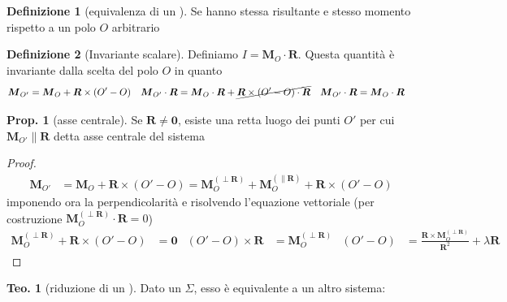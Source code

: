 \documentclass[a4paper,10pt]{article}
\theoremstyle{definition}
\theoremstyle{indentdefinition}
\newtheorem{defn}{Definizione}[section]
\theoremstyle{indenttheorem}
\newtheorem{thm}{Teo.}
\newtheorem{prop}{Prop.}
\theoremstyle{myremark}
\theoremstyle{indentgeneral}
\begin{document}
\begin{defn}[equivalenza di un ]
\label{def:equivalenza-sistema-vettori-applicati}Se hanno stessa
risultante e stesso momento rispetto a un polo $O$ arbitrario
\end{defn}

\begin{defn}[Invariante scalare]
\label{def:invariante-momento}Definiamo $I=\boldsymbol{M}_{O}\cdot\boldsymbol{R}$.
Questa quantità è invariante dalla scelta del polo $O$ in quanto
\begin{align*}
\boldsymbol{M}_{O'} & =\boldsymbol{M}_{O}+\boldsymbol{R}\times\left(O'-O\right) & \boldsymbol{M}_{O'}\cdot\boldsymbol{R} & =\boldsymbol{M}_{O}\cdot\boldsymbol{R}+\cancel{\boldsymbol{R}\times\left(O'-O\right)\cdot\boldsymbol{R}} & \boldsymbol{M}_{O'}\cdot\boldsymbol{R} & =\boldsymbol{M}_{O}\cdot\boldsymbol{R}
\end{align*}
\end{defn}

\begin{prop}[asse centrale]
\label{prop:asse-centrale}Se $\boldsymbol{R}\neq\boldsymbol{0}$,
esiste una retta luogo dei punti $O'$ per cui $\boldsymbol{M}_{O'}\parallel\boldsymbol{R}$
detta asse centrale del sistema
\end{prop}

\begin{proof}
\begin{align*}
\boldsymbol{M}_{O'} & =\boldsymbol{M}_{O}+\boldsymbol{R}\times\left(O'-O\right)=\boldsymbol{M}_{O}^{\left(\perp\boldsymbol{R}\right)}+\boldsymbol{M}_{O}^{\left(\parallel\boldsymbol{R}\right)}+\boldsymbol{R}\times\left(O'-O\right)
\end{align*}
imponendo ora la perpendicolarità e risolvendo l'equazione vettoriale
(per costruzione $\boldsymbol{M}_{O}^{\left(\perp\boldsymbol{R}\right)}\cdot\boldsymbol{R}=0$)
\begin{align*}
\boldsymbol{M}_{O}^{\left(\perp\boldsymbol{R}\right)}+\boldsymbol{R}\times\left(O'-O\right) & =\boldsymbol{0} & \left(O'-O\right)\times\boldsymbol{R} & =\boldsymbol{M}_{O}^{\left(\perp\boldsymbol{R}\right)} & \left(O'-O\right) & =\frac{\boldsymbol{R}\times\boldsymbol{M}_{O}^{\left(\perp\boldsymbol{R}\right)}}{\boldsymbol{R}^{2}}+\lambda\boldsymbol{R}
\end{align*}
\end{proof}
\begin{thm}[riduzione di un ]
\label{def:riduzione-sistema-vettori-applicati}Dato un  $\Sigma$,
esso è equivalente a un altro sistema:
\end{thm}
\end{document}
